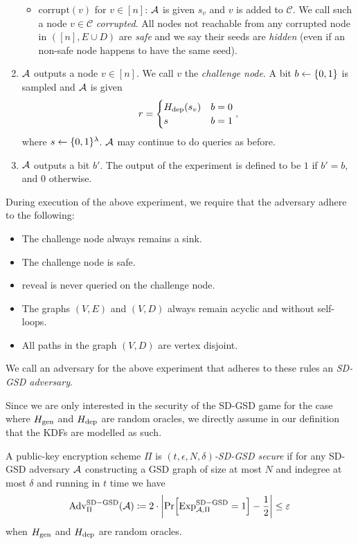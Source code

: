 \begin{definition}
\begin{enumerate}[1.]
\begin{itemize}
			      \item $\mathrm{corrupt}(v)$ for $v \in [n]$: $\mathcal{A}$ is given $s_v$ and $v$ is added to $\mathcal{C}$. We call such a node $v \in \mathcal{C}$ \emph{corrupted}. All nodes not reachable from any corrupted node in $([n], E \cup D)$ are \emph{safe} and we say their seeds are \emph{hidden} (even if an non-safe node happens to have the same seed).
		      \end{itemize}
		\item $\mathcal{A}$ outputs a node $v \in [n]$. We call $v$ the \emph{challenge node}. A bit $b \leftarrow \{0, 1\}$ is sampled and $\mathcal{A}$ is given
		      $$
			      r = \begin{cases}
				      H_\mathrm{dep}(s_v) & b = 0 \\
				      s          & b = 1
			      \end{cases},
		      $$
		      where $s \leftarrow \{0, 1\}^\lambda$. $\mathcal{A}$ may continue to do queries as before.
		\item $\mathcal{A}$ outputs a bit $b'$. The output of the experiment is defined to be $1$ if $b' = b$, and $0$ otherwise.
	\end{enumerate}

	During execution of the above experiment, we require that the adversary adhere to the following:
	\begin{itemize}
		\item The challenge node always remains a sink.
		\item The challenge node is safe.
		\item $\mathrm{reveal}$ is never queried on the challenge node.
		\item The graphs $(V, E)$ and $(V, D)$ always remain acyclic and without self-loops.
		\item All paths in the graph $(V, D)$ are vertex disjoint.
	\end{itemize}

	We call an adversary for the above experiment that adheres to these rules an \emph{SD-GSD adversary}.

\end{definition}

Since we are only interested in the security of the SD-GSD game for the case where $H_\mathrm{gen}$ and $H_\mathrm{dep}$ are random oracles, we directly assume in our definition that the KDFs are modelled as such.

\begin{definition}

	A public-key encryption scheme $\Pi$ is \emph{$(t, \epsilon, N, \delta)$-SD-GSD secure} if for any SD-GSD adversary $\mathcal{A}$ constructing a GSD graph of size at most $N$ and indegree at most $\delta$ and running in $t$ time we have
	\begin{align*}
		\mathrm{Adv}_{\Pi}^{\mathrm{SD-GSD}}(\adv) \coloneqq 2 \cdot \abs*{\pr{\mathrm{Exp}_{\adv, \Pi}^{\mathrm{SD-GSD}} = 1} - \frac{1}{2}} \le \epsilon
	\end{align*}
	when $H_\mathrm{gen}$ and $H_\mathrm{dep}$ are random oracles.

\end{definition}

